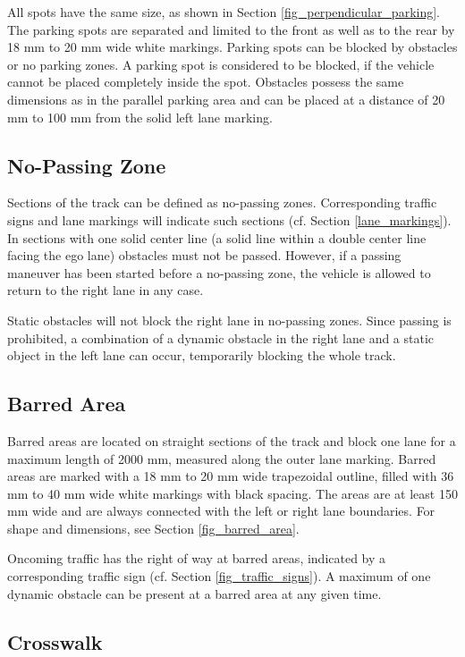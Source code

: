 All spots have the same size, as shown in Section \ref{fig_perpendicular_parking}.
The parking spots are separated and limited to the front as well as to the rear by 18 mm to 20 mm wide white markings.
Parking spots can be blocked by obstacles or no parking zones.
A parking spot is considered to be blocked, if the vehicle cannot be placed completely inside the spot.
Obstacles possess the same dimensions as in the parallel parking area and can be placed at a distance of 20 mm to 100 mm from the solid left lane marking.

\subsection{No-Passing Zone}
\label{no_passing_zones}

Sections of the track can be defined as no-passing zones.
Corresponding traffic signs and lane markings will indicate such sections (cf. Section \ref{lane_markings}).
In sections with one solid center line (a solid line within a double center line facing the ego lane) obstacles must not be passed.
However, if a passing maneuver has been started before a no-passing zone, the vehicle is allowed to return to the right lane in any case.

Static obstacles will not block the right lane in no-passing zones.
Since passing is prohibited, a combination of a dynamic obstacle in the right lane and a static object in the left lane can occur, temporarily blocking the whole track.

\subsection{Barred Area}
\label{barred_area}

Barred areas are located on straight sections of the track and block one lane for a maximum length of 2000 mm, measured along the outer lane marking.
Barred areas are marked with a 18 mm to 20 mm wide trapezoidal outline, filled with 36 mm to 40 mm wide white markings with black spacing.
The areas are at least 150 mm wide and are always connected with the left or right lane boundaries.
For shape and dimensions, see Section \ref{fig_barred_area}.

Oncoming traffic has the right of way at barred areas, indicated by a corresponding traffic sign (cf. Section \ref{fig_traffic_signs}).
A maximum of one dynamic obstacle can be present at a barred area at any given time.

\subsection{Crosswalk}

